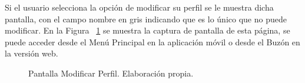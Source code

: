 Si el usuario selecciona la opción de modificar su perfil se le muestra dicha pantalla, con el campo nombre en gris indicando que es lo único que no puede modificar. En la Figura ~\ref{fig:ModificarPerfil} se muestra la captura de pantalla de esta página, se puede acceder desde el Menú Principal en la aplicación móvil o desde el Buzón en la versión web.
\begin{figure}[htp]
  \centering
  \quad
  \caption{Pantalla Modificar Perfil. Elaboración propia.}
  \label{fig:ModificarPerfil}
\end{figure} 	

